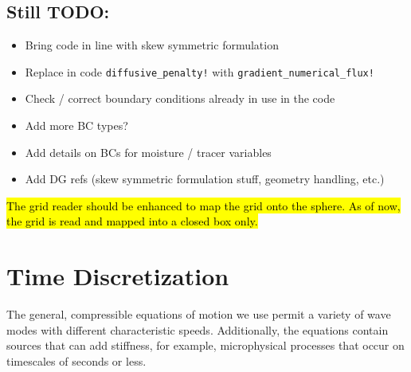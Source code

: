 \documentclass{report}
\numberwithin{equation}{section}
\begin{document}
\section{Still TODO:}
\begin{itemize}
  \item Bring code in line with skew symmetric formulation
  \item Replace in code \texttt{diffusive\_penalty!} with
    \texttt{gradient\_numerical\_flux!}
  \item Check / correct boundary conditions already in use in the code
  \item Add more BC types?
  \item Add details on BCs for moisture / tracer variables
  \item Add DG refs (skew symmetric formulation stuff, geometry handling, etc.)
\end{itemize}

\hl{The grid reader should be enhanced to map the grid onto the sphere. As of now, the grid is read and mapped into a closed box only.}


\chapter{Time Discretization}\label{s:timestepping}

The general, compressible equations of motion we use permit a variety of wave modes with different characteristic speeds. Additionally, the equations contain sources that can add stiffness, for example, microphysical processes that occur on timescales of seconds or less.
\end{document}
